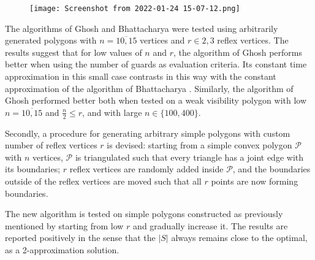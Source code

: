 \begin{figure}[h!]
    \centering
    \texttt{[image: Screenshot from 2022-01-24 15-07-12.png]}
    \caption{}
    \label{fig:weak}
\end{figure}

The algorithms of Ghosh \cite{GHOSH2010718} and Bhattacharya \cite{bhattacharya2016approximability} were tested using arbitrarily generated polygons with $n = \overline{10, 15}$ vertices and $r \in {2, 3}$ reflex vertices. The results suggest that for low values of $n$ and $r$, the algorithm of Ghosh \cite{GHOSH2010718} performs better when using the number of guards as evaluation criteria. Its constant time approximation in this small case contrasts in this way with the constant approximation of the algorithm of Bhattacharya \cite{bhattacharya2016approximability}. Similarly, the algorithm of Ghosh \cite{GHOSH2010718} performed better both when tested on a weak visibility polygon with low $n = \overline{10, 15}$ and $\frac n 2 \leq r$, and with large $n \in \{100, 400\}$.

Secondly, a procedure for generating arbitrary simple polygons with custom number of reflex vertices $r$ is devised: starting from a simple convex polygon $\mathcal P$ with $n$ vertices, $\mathcal P$ is triangulated such that every triangle has a joint edge with its boundaries; $r$ reflex vertices are randomly added inside $\mathcal P$, and the boundaries outside of the reflex vertices are moved such that all $r$ points are now forming boundaries.

The new algorithm is tested on simple polygons constructed as previously mentioned by starting from low $r$ and gradually increase it. The results are reported positively in the sense that the $|S|$ always remains close to the optimal, as a 2-approximation solution.

